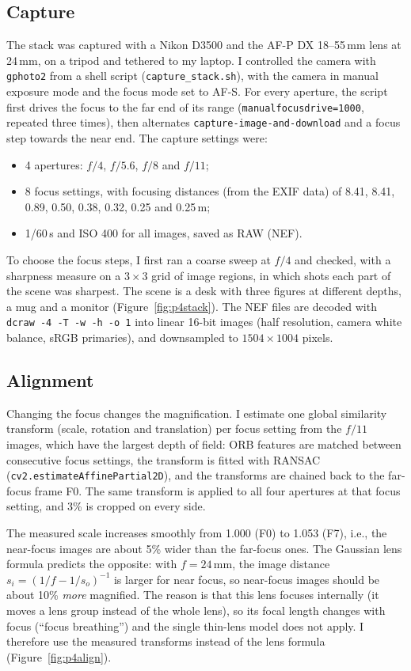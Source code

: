 \documentclass[11pt]{article}
\begin{document}
\subsection*{Capture}
The stack was captured with a Nikon D3500 and the AF-P DX 18--55\,mm lens at 24\,mm, on a tripod and tethered to my laptop. I controlled the camera with \texttt{gphoto2} from a shell script (\texttt{capture\_stack.sh}), with the camera in manual exposure mode and the focus mode set to AF-S. For every aperture, the script first drives the focus to the far end of its range (\texttt{manualfocusdrive=1000}, repeated three times), then alternates \texttt{capture-image-and-download} and a focus step towards the near end. The capture settings were:
\begin{itemize}\setlength{\itemsep}{0pt}
\item 4 apertures: $f/4$, $f/5.6$, $f/8$ and $f/11$;
\item 8 focus settings, with focusing distances (from the EXIF data) of 8.41, 8.41, 0.89, 0.50, 0.38, 0.32, 0.25 and 0.25\,m;
\item 1/60\,s and ISO 400 for all images, saved as RAW (NEF).
\end{itemize}
To choose the focus steps, I first ran a coarse sweep at $f/4$ and checked, with a sharpness measure on a $3\times3$ grid of image regions, in which shots each part of the scene was sharpest. The scene is a desk with three figures at different depths, a mug and a monitor (Figure~\ref{fig:p4stack}). The NEF files are decoded with \texttt{dcraw -4 -T -w -h -o 1} into linear 16-bit images (half resolution, camera white balance, sRGB primaries), and downsampled to $1504\times1004$ pixels.

\subsection*{Alignment}
Changing the focus changes the magnification. I estimate one global similarity transform (scale, rotation and translation) per focus setting from the $f/11$ images, which have the largest depth of field: ORB features are matched between consecutive focus settings, the transform is fitted with RANSAC (\texttt{cv2.estimateAffinePartial2D}), and the transforms are chained back to the far-focus frame F0. The same transform is applied to all four apertures at that focus setting, and 3\% is cropped on every side.

The measured scale increases smoothly from 1.000 (F0) to 1.053 (F7), i.e., the near-focus images are about 5\% wider than the far-focus ones. The Gaussian lens formula predicts the opposite: with $f=24$\,mm, the image distance $s_i=(1/f-1/s_o)^{-1}$ is larger for near focus, so near-focus images should be about 10\% \emph{more} magnified. The reason is that this lens focuses internally (it moves a lens group instead of the whole lens), so its focal length changes with focus (``focus breathing'') and the single thin-lens model does not apply. I therefore use the measured transforms instead of the lens formula (Figure~\ref{fig:p4align}).
\end{document}

